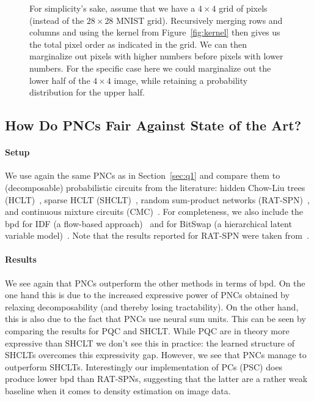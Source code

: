 \documentclass[letterpaper]{article} %
\begin{document}
\begin{figure}[t]



	\caption{For simplicity's sake, assume that we have a $4\times4$ grid of pixels (instead of the $28\times 28$ MNIST grid). Recursively merging rows and columns and using the kernel from Figure~\ref{fig:kernel} then gives us the  total pixel order as indicated in the grid. We can then marginalize out pixels with higher numbers before pixels with lower numbers.
		For the specific case here we could marginalize out the lower half of the $4\times 4$ image, while retaining a probability distribution for the upper half.
	}
	\label{fig:2dorder}

\end{figure}

\subsection{How Do PNCs Fair Against State of the Art?}

\paragraph*{Setup} We use again the same PNCs as in Section~\ref{sec:q1} and compare them to (decomposable) probabilistic circuits from the literature: hidden Chow-Liu trees (HCLT)~\citep{liu2021tractable}, sparse HCLT (SHCLT)~\citep{dang2022sparse}, random sum-product networks (RAT-SPN)~\citep{peharz2019random}, and continuous mixture circuits (CMC)~\citep{correia2023continuous}. For completeness, we also include the bpd for IDF (a flow-based approach)~\citep{hoogeboom2019integer} and for BitSwap (a hierarchical latent variable model)~\citep{kingma2019bit}. Note that the results reported for RAT-SPN were taken from~\citep{dang2022sparse}.

\paragraph*{Results}
We see again that PNCs outperform the other methods in terms of bpd. On the one hand this is due to the increased expressive power of PNCs obtained by relaxing decomposability (and thereby losing tractability). On the other hand, this is also due to the fact that PNCs use neural sum units. This can be seen by comparing the results for PQC and SHCLT. While PQC are in theory more expressive than SHCLT we don't see this in practice: the learned structure of SHCLTs overcomes this expressivity gap. However, we see that PNCs manage to outperform SHCLTs.
Interestingly our implementation of PCs (PSC) does produce lower bpd than RAT-SPNs, suggesting that the latter are a rather weak baseline when it comes to density estimation on image data.
\end{document}
